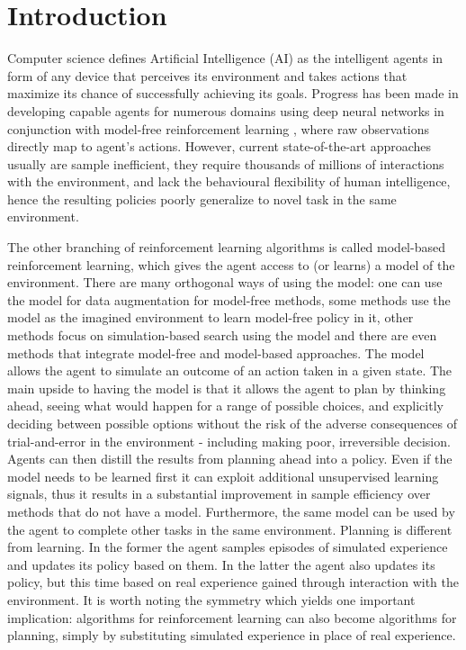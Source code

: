 \section{Introduction}

Computer science defines Artificial Intelligence (AI) as the intelligent agents in form of any device that perceives its environment and takes actions that maximize its chance of successfully achieving its goals. Progress has been made in developing capable agents for numerous domains using deep neural networks in conjunction with model-free reinforcement learning \cite{Algo.Rainbow}\cite{Algo.A3C}\cite{Algo.PPO}, where raw observations directly map to agent's actions. However, current state-of-the-art approaches usually are sample inefficient, they require thousands of millions of interactions with the environment, and lack the behavioural flexibility of human intelligence, hence the resulting policies poorly generalize to novel task in the same environment.

The other branching of reinforcement learning algorithms is called model-based reinforcement learning, which gives the agent access to (or learns) a model of the environment. There are many orthogonal ways of using the model: one can use the model for data augmentation for model-free methods\cite{Algo.MBVE}, some methods use the model as the imagined environment to learn model-free policy in it\cite{Algo.WorldModels}, other methods focus on simulation-based search using the model\cite{Algo.AlphaZero} and there are even methods that integrate model-free and model-based approaches\cite{Algo.I2A}. The model allows the agent to simulate an outcome of an action taken in a given state. The main upside to having the model is that it allows the agent to plan by thinking ahead, seeing what would happen for a range of possible choices, and explicitly deciding between possible options without the risk of the adverse consequences of trial-and-error in the environment - including making poor, irreversible decision. Agents can then distill the results from planning ahead into a policy. Even if the model needs to be learned first it can exploit additional unsupervised learning signals, thus it results in a substantial improvement in sample efficiency over methods that do not have a model. Furthermore, the same model can be used by the agent to complete other tasks in the same environment.
Planning is different from learning. In the former the agent samples episodes of simulated experience and updates its policy based on them. In the latter the agent also updates its policy, but this time based on real experience gained through interaction with the environment. It is worth noting the symmetry which yields one important implication: algorithms for reinforcement learning can also become algorithms for planning, simply by substituting simulated experience in place of real experience.

